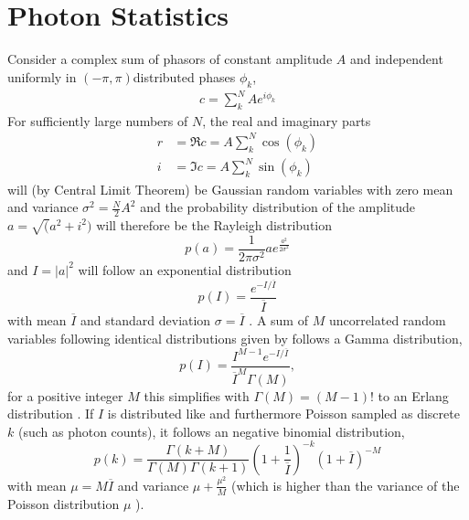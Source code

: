 \section{Photon Statistics}
Consider a complex sum of phasors of constant amplitude $A$ and independent uniformly in $(-\pi,\pi)$distributed phases $\phi_k$,
\begin{align}
	c=\sum^N_k A e^{i\phi_k}
\end{align}
For sufficiently large numbers of $N$, the real and imaginary parts
\begin{align*}
	r&=\Re c =  A \sum^N_k \cos(\phi_k)\\
	i&= \Im c =A \sum^N_k \sin(\phi_k)
\end{align*}
will (by Central Limit Theorem) be Gaussian random variables with zero mean and variance $\sigma^2=\frac{N}{2}A^2$ and the probability distribution of the amplitude $a=\sqrt(a^2+i^2)$ will  therefore be the Rayleigh distribution
\begin{equation}
	p(a)=\frac{1}{2\pi\sigma^2} a e^{\frac{a^2}{2\sigma^2}}
\end{equation}
and  $I=\left|a\right|^2$ will  follow an exponential distribution
\begin{equation}
	\label{eq:expdistr}
	p(I)=\frac{ e^{-I/\overline{I}}}{\overline{I}}
\end{equation} 
with mean $\overline{I}$ and standard deviation $\sigma=\overline{I}$  \cite{goodman2000,goodman1976}.
A sum of $M$ uncorrelated random variables following identical distributions given by  follows a Gamma distribution,
\begin{equation}
	\label{eq:gammadistr}
	p(I)=\frac{I^{M-1} e^{-I/\overline{I}}} {\overline{I}^M \Gamma(M)},
\end{equation}
for a positive integer $M$ this simplifies with $\Gamma(M)=(M-1)!$ to an Erlang distribution  \cite{forbes2010,trost2020}.
If $I$ is distributed like  and furthermore Poisson sampled as discrete $k$ (such as photon counts), it follows  an negative binomial distribution,
\cite{trost2020,mandel1959,holmes2019}
\begin{equation}
	p(k)=
	\frac{\Gamma(k+M)}{\Gamma(M)\Gamma(k+1) }
	\left( 1+\frac{1}{\overline{I}}
	\right)^{-k}
	\left( 1+\overline{I}
	\right)^{-M}
\end{equation}
with mean $\mu=M\overline{I}$ and variance $\mu+\frac{\mu^2}{M}$ (which is higher than the variance of the Poisson distribution $\mu$ ).

